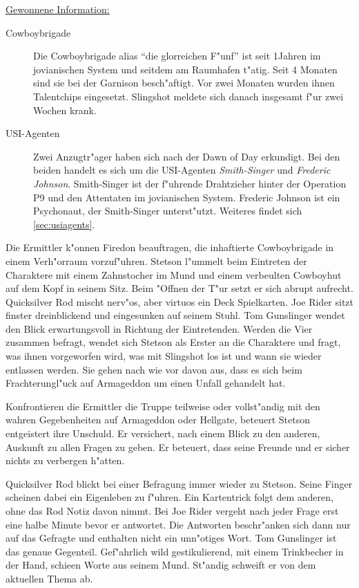 \begin{remarks}
	\underline{Gewonnene Information:}
	
	\begin{description}
		\item[Cowboybrigade] Die Cowboybrigade alias "`die glorreichen F"unf"' ist seit 1\half Jahren im jovianischen System und seitdem am 
			Raumhafen t"atig. Seit 4 Monaten sind sie bei der Garnison besch"aftigt. Vor zwei Monaten wurden ihnen Talentchips eingesetzt. Slingshot meldete sich danach insgesamt f"ur zwei Wochen krank.
		\item[USI-Agenten] Zwei Anzugtr"ager haben sich nach der Dawn of Day erkundigt. Bei den beiden handelt es sich um die USI-Agenten  
			\emph{Smith-Singer} und \emph{Frederic Johnson}. Smith-Singer ist der f"uhrende Drahtzieher hinter der Operation P9 und den Attentaten im jovianischen System. Frederic Johnson ist ein Psychonaut, der Smith-Singer unterst"utzt. Weiteres findet sich \cref{sec:usiagents}.
	\end{description}
\end{remarks}



Die Ermittler k"onnen Firedon beauftragen, die inhaftierte Cowboybrigade in einem Verh"orraum vorzuf"uhren. Stetson l"ummelt beim Eintreten der Charaktere mit einem Zahnstocher im Mund und einem verbeulten Cowboyhut auf dem Kopf in seinem Sitz. Beim "Offnen der T"ur setzt er sich abrupt aufrecht. Quicksilver Rod mischt nerv"os, aber virtuos ein Deck Spielkarten. Joe Rider sitzt finster dreinblickend und eingesunken auf seinem Stuhl. Tom Gunslinger wendet den Blick erwartungsvoll in Richtung der Eintretenden. Werden die Vier zusammen befragt, wendet sich Stetson als Erster an die Charaktere und fragt, was ihnen vorgeworfen wird, was mit Slingshot los ist und wann sie wieder entlassen werden. Sie gehen nach wie vor davon aus, dass es sich beim Frachterungl"uck auf Armageddon um einen Unfall gehandelt hat.

Konfrontieren die Ermittler die Truppe teilweise oder vollst"andig mit den wahren Gegebenheiten auf Armageddon oder Hellgate, beteuert Stetson entgeistert ihre Unschuld. Er versichert, nach einem Blick zu den anderen, Auskunft zu allen Fragen zu geben. Er beteuert, dass seine Freunde und er sicher nichts zu verbergen h"atten.

Quicksilver Rod blickt bei einer Befragung immer wieder zu Stetson. Seine Finger scheinen dabei ein Eigenleben zu f"uhren. Ein Kartentrick folgt dem anderen, ohne das Rod Notiz davon nimmt. Bei Joe Rider vergeht nach jeder Frage erst eine halbe Minute bevor er antwortet. Die Antworten beschr"anken sich dann nur auf das Gefragte und enthalten nicht ein unn"otiges Wort. Tom Gunslinger ist das genaue Gegenteil. Gef"ahrlich wild gestikulierend, mit einem Trinkbecher in der Hand, schie\3en Worte aus seinem Mund. St"andig schweift er von dem aktuellen Thema ab.

